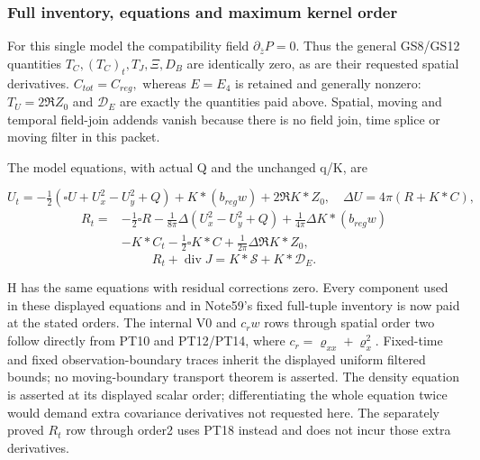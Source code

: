 \subsubsection{Full inventory, equations and maximum kernel order}
\label{subsec:pt-7}

For this single model the compatibility field $\partial_{\bar z}P=0$. Thus the general GS8/GS12 quantities \(T_{C},(T_{C})_{t},T_{J},\Xi,D_{B}\) are identically zero, as are their requested spatial derivatives. \(C_{tot}=C_{reg},\) whereas \(E=E_{4}\) is retained and generally nonzero: $T_U=2\Re Z_0$ and \(\mathcal D_E\) are exactly the quantities paid above. Spatial, moving and temporal field-join addends vanish because there is no field join, time splice or moving filter in this packet.

The model equations, with actual Q and the unchanged q/K, are

\[
U_t=-\tfrac12(\square U+U_x^2-U_y^2+Q)
                +K*(b_{reg}w)+2\Re K*Z_0,\quad
\Delta U=4\pi(R+K*C),
\]
\[
\begin{split}
R_t={}&-\tfrac12\square R-\tfrac1{8\pi}\Delta(U_x^2-U_y^2+Q)
 +\tfrac1{4\pi}\Delta K*(b_{reg}w)\\
 &-K*C_t-\tfrac12\square K*C+\tfrac1{2\pi}\Delta\Re K*Z_0,
\end{split}
\]
\[
R_t+\operatorname{div}J=K*\mathcal S+K*\mathcal D_E.
\tag{PT23}\label{eq:ansatz-pt23}
\]

H has the same equations with residual corrections zero. Every component used in these displayed equations and in Note59's fixed full-tuple inventory is now paid at the stated orders. The internal V0 and \(c_{r} w\) rows through spatial order two follow directly from PT10 and PT12/PT14, where \(c_{r}=\varrho_{xx}+\varrho_{x}^{2}.\) Fixed-time and fixed observation-boundary traces inherit the displayed uniform filtered bounds; no moving-boundary transport theorem is asserted. The density equation is asserted at its displayed scalar order; differentiating the whole equation twice would demand extra covariance derivatives not requested here. The separately proved \(R_{t}\) row through order2 uses PT18 instead and does not incur those extra derivatives.

